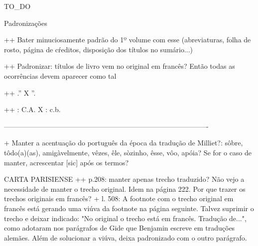 TO_DO

Padronizações


++ Bater minuciosamente padrão do 1º volume com esse (abreviaturas, folha de rosto, página de cŕeditos, disposição dos títulos no sumário...)

++ Padronizar: títulos de livro vem no original em francês? Então todas as ocorrências devem aparecer como tal

++ .'' X ''.

++ : C.A. X : c.b.

----------------------------------------------------------------------------------------


+ Manter a acentuação do português da época da tradução de Milliet?: sôbre, tôdo(a)(as), amigàvelmente, vêzes, êle, sòzinho, êsse, vôo, apóia? Se for o caso de manter, acrescentar [sic] após os termos?

CARTA PARISIENSE ++ p.208: manter apenas trecho traduzido? Não vejo a necessidade de manter o trecho original. Idem na página 222. Por que trazer os trechos originais em francês? + l. 508: A footnote com o trecho original em francês está gerando uma viúva da footnote na página seguinte. Talvez suprimir o trecho e deixar indicado: "No original o trecho está em francês. Tradução de...", como adotaram nos parágrafos de Gide que Benjamin escreve em traduções alemães. Além de solucionar a viúva, deixa padronizado com o outro parágrafo.